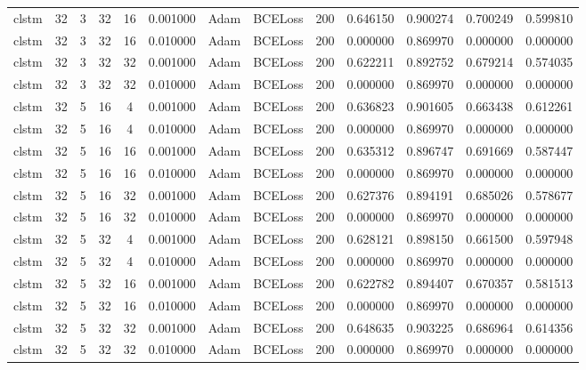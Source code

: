 \documentclass[10pt,twocolumn,letterpaper]{article}
\begin{document}
\begin{appendices}
{\begin{center}
\begin{tabular}{ |c|c|c|c|c|c|c|c|c|c|c|c|c| }
         clstm & 32 & 3 & 32 & 16 & 0.001000 & Adam & BCELoss & 200 & 0.646150 & 0.900274 & 0.700249 & 0.599810 \\
         clstm & 32 & 3 & 32 & 16 & 0.010000 & Adam & BCELoss & 200 & 0.000000 & 0.869970 & 0.000000 & 0.000000 \\
         clstm & 32 & 3 & 32 & 32 & 0.001000 & Adam & BCELoss & 200 & 0.622211 & 0.892752 & 0.679214 & 0.574035 \\
         clstm & 32 & 3 & 32 & 32 & 0.010000 & Adam & BCELoss & 200 & 0.000000 & 0.869970 & 0.000000 & 0.000000 \\
         clstm & 32 & 5 & 16 & 4 & 0.001000 & Adam & BCELoss & 200 & 0.636823 & 0.901605 & 0.663438 & 0.612261 \\
         clstm & 32 & 5 & 16 & 4 & 0.010000 & Adam & BCELoss & 200 & 0.000000 & 0.869970 & 0.000000 & 0.000000 \\
         clstm & 32 & 5 & 16 & 16 & 0.001000 & Adam & BCELoss & 200 & 0.635312 & 0.896747 & 0.691669 & 0.587447 \\
         clstm & 32 & 5 & 16 & 16 & 0.010000 & Adam & BCELoss & 200 & 0.000000 & 0.869970 & 0.000000 & 0.000000 \\
         clstm & 32 & 5 & 16 & 32 & 0.001000 & Adam & BCELoss & 200 & 0.627376 & 0.894191 & 0.685026 & 0.578677 \\
         clstm & 32 & 5 & 16 & 32 & 0.010000 & Adam & BCELoss & 200 & 0.000000 & 0.869970 & 0.000000 & 0.000000 \\
         clstm & 32 & 5 & 32 & 4 & 0.001000 & Adam & BCELoss & 200 & 0.628121 & 0.898150 & 0.661500 & 0.597948 \\
         clstm & 32 & 5 & 32 & 4 & 0.010000 & Adam & BCELoss & 200 & 0.000000 & 0.869970 & 0.000000 & 0.000000 \\
         clstm & 32 & 5 & 32 & 16 & 0.001000 & Adam & BCELoss & 200 & 0.622782 & 0.894407 & 0.670357 & 0.581513 \\
         clstm & 32 & 5 & 32 & 16 & 0.010000 & Adam & BCELoss & 200 & 0.000000 & 0.869970 & 0.000000 & 0.000000 \\
         clstm & 32 & 5 & 32 & 32 & 0.001000 & Adam & BCELoss & 200 & 0.648635 & 0.903225 & 0.686964 & 0.614356 \\
         clstm & 32 & 5 & 32 & 32 & 0.010000 & Adam & BCELoss & 200 & 0.000000 & 0.869970 & 0.000000 & 0.000000 \\
      \hline
   \end{tabular} 
   \end{center}
   }


\end{appendices}
\end{document}
